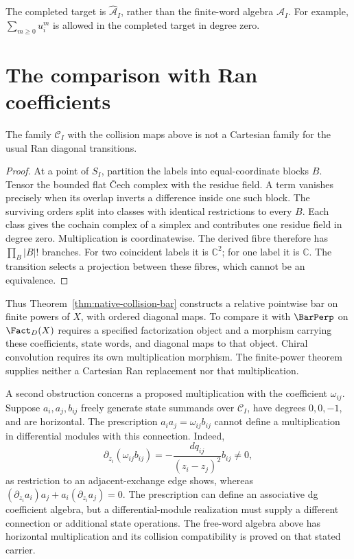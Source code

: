 The completed target is $\widehat{\mathcal A}_I$, rather than the
finite-word algebra $\mathcal A_I$. For example,
$\sum_{m\ge0}u_i^m$ is allowed in the completed target in degree zero.

\clearpage
\section{The comparison with Ran coefficients}

\begin{proposition}
\label{prop:native-collision-ran-boundary}
The family $\mathcal C_I$ with the collision maps above is not
a Cartesian family for the usual Ran diagonal transitions.
\end{proposition}
\begin{proof}
At a point of $S_I$, partition the labels into equal-coordinate
blocks $B$. Tensor the bounded flat \v{C}ech complex with the
residue field. A term vanishes precisely when its overlap inverts
a difference inside one such block. The surviving orders split
into classes with identical restrictions to every $B$.
Each class gives the cochain complex of a simplex and contributes
one residue field in degree zero. Multiplication is coordinatewise.
The derived fibre therefore has $\prod_B |B|!$ branches.
For two coincident labels it is $\mathbb C^2$; for one label it
is $\mathbb C$. The transition selects a projection between
these fibres, which cannot be an equivalence.
\end{proof}

Thus Theorem~\ref{thm:native-collision-bar} constructs a relative
pointwise bar on finite powers of $X$, with ordered diagonal maps.
To compare it with $\BarPerp$ on $\Fact_D(X)$ requires a specified
factorization object and a morphism carrying these coefficients,
state words, and diagonal maps to that object. Chiral convolution
requires its own multiplication morphism. The finite-power theorem
supplies neither a Cartesian Ran replacement nor that multiplication.

A second obstruction concerns a proposed multiplication with the
coefficient $\omega_{ij}$. Suppose $a_i,a_j,b_{ij}$ freely generate
state summands over $\mathcal C_I$, have degrees $0,0,-1$, and are
horizontal. The prescription
$a_ia_j=\omega_{ij}b_{ij}$ cannot define a multiplication in
differential modules with this connection. Indeed,
\[
 \partial_{z_i}(\omega_{ij}b_{ij})
 =-\frac{dq_{ij}}{(z_i-z_j)^2}b_{ij}\ne0,
\]
as restriction to an adjacent-exchange edge shows, whereas
$(\partial_{z_i}a_i)a_j+a_i(\partial_{z_i}a_j)=0$.
The prescription can define an associative dg coefficient algebra,
but a differential-module realization must supply a different
connection or additional state operations. The free-word algebra
above has horizontal multiplication and its collision compatibility
is proved on that stated carrier.
